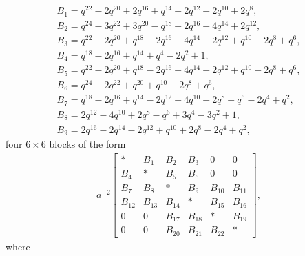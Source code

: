 \documentclass[pdftex]{sigma}
\numberwithin{equation}{section}
\theoremstyle{definition}
\newcommand{\flac}[2]{#1}
\begin{document}
\begin{gather*}
 B_1 =
\flac{q^{22}}{a^2}-\flac{2q^{20}}{a^2}+\flac{2q^{16}}{a^2}+\flac{q^{14}}{a^2}-\flac{2q^{12}}{a^2}-\flac{2q^{10}}{a^2}+\flac{2q^{8}}{a^2}, \\
 B_2 =
\flac{q^{24}}{a^2}-\flac{3q^{22}}{a^2}+\flac{3q^{20}}{a^2}-\flac{q^{18}}{a^2}+\flac{2q^{16}}{a^2}-\flac{4q^{14}}{a^2}+\flac{2q^{12}}{a^2}, \\
 B_3 =
\flac{q^{22}}{a^2}-\flac{2q^{20}}{a^2}+\flac{q^{18}}{a^2}-\flac{2q^{16}}{a^2}+\flac{4q^{14}}{a^2}-\flac{2q^{12}}{a^2}+\flac{q^{10}}{a^2}-\flac{2q^{8}}{a^2}+\flac{q^{6}}{a^2}, \\
 B_4 =
\flac{q^{18}}{a^2}-\flac{2q^{16}}{a^2}+\flac{q^{14}}{a^2}+\flac{q^{4}}{a^2}-\flac{2q^{2}}{a^2}+\flac{1}{a^2}, \\
 B_5 =
\flac{q^{22}}{a^2}-\flac{2q^{20}}{a^2}+\flac{q^{18}}{a^2}-\flac{2q^{16}}{a^2}+\flac{4q^{14}}{a^2}-\flac{2q^{12}}{a^2}+\flac{q^{10}}{a^2}-\flac{2q^{8}}{a^2}+\flac{q^{6}}{a^2}, \\
 B_6 =
\flac{q^{24}}{a^2}-\flac{2q^{22}}{a^2}+\flac{q^{20}}{a^2}+\flac{q^{10}}{a^2}-\flac{2q^{8}}{a^2}+\flac{q^{6}}{a^2}, \\
 B_7 =
\flac{q^{18}}{a^2}-\flac{2q^{16}}{a^2}+\flac{q^{14}}{a^2}-\flac{2q^{12}}{a^2}+\flac{4q^{10}}{a^2}-\flac{2q^{8}}{a^2}+\flac{q^{6}}{a^2}-\flac{2q^{4}}{a^2}+\flac{q^{2}}{a^2}, \\
 B_8 =
\flac{2q^{12}}{a^2}-\flac{4q^{10}}{a^2}+\flac{2q^{8}}{a^2}-\flac{q^{6}}{a^2}+\flac{3q^{4}}{a^2}-\flac{3q^{2}}{a^2}+\flac{1}{a^2}, \\
 B_9 =
\flac{2q^{16}}{a^2}-\flac{2q^{14}}{a^2}-\flac{2q^{12}}{a^2}+\flac{q^{10}}{a^2}+\flac{2q^{8}}{a^2}-\flac{2q^{4}}{a^2}+\flac{q^{2}}{a^2},
\end{gather*}
four $6 \times 6$ blocks of the form
\begin{align*}
 a^{-2} \begin{bmatrix}
 * & B_1 & B_2 & B_3 & 0 & 0 \\
 B_4 & * & B_5 & B_6 & 0 & 0 \\
 B_7 & B_8 & * & B_9 & B_{10} & B_{11} \\
 B_{12} & B_{13} & B_{14} & * & B_{15} & B_{16} \\
 0 & 0 & B_{17} & B_{18} & * & B_{19} \\
 0 & 0 & B_{20} & B_{21} & B_{22} & *
 \end{bmatrix},
\end{align*}
where
\end{document}
